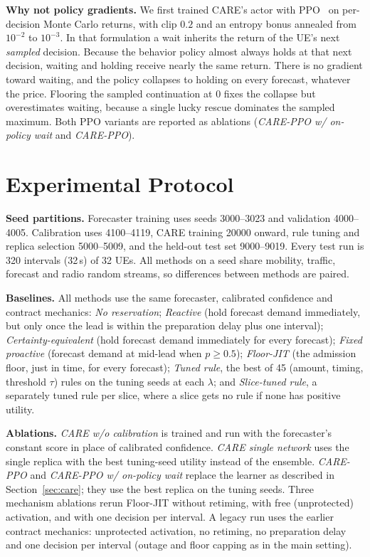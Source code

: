 \documentclass[journal]{IEEEtran}
\begin{document}
\textbf{Why not policy gradients.} We first trained CARE's actor with PPO~\cite{schulman2017ppo} on per-decision Monte Carlo returns, with clip $0.2$ and an entropy bonus annealed from $10^{-2}$ to $10^{-3}$. In that formulation a wait inherits the return of the UE's next \emph{sampled} decision. Because the behavior policy almost always holds at that next decision, waiting and holding receive nearly the same return. There is no gradient toward waiting, and the policy collapses to holding on every forecast, whatever the price. Flooring the sampled continuation at $0$ fixes the collapse but overestimates waiting, because a single lucky rescue dominates the sampled maximum. Both PPO variants are reported as ablations (\emph{CARE-PPO w/ on-policy wait} and \emph{CARE-PPO}).

\section{Experimental Protocol}\label{sec:protocol}
\textbf{Seed partitions.} Forecaster training uses seeds 3000--3023 and validation 4000--4005. Calibration uses 4100--4119, CARE training 20000 onward, rule tuning and replica selection 5000--5009, and the held-out test set 9000--9019. Every test run is 320 intervals (32\,s) of 32 UEs. All methods on a seed share mobility, traffic, forecast and radio random streams, so differences between methods are paired.

\textbf{Baselines.} All methods use the same forecaster, calibrated confidence and contract mechanics:
\emph{No reservation};
\emph{Reactive} (hold forecast demand immediately, but only once the lead is within the preparation delay plus one interval);
\emph{Certainty-equivalent} (hold forecast demand immediately for every forecast);
\emph{Fixed proactive} (forecast demand at mid-lead when $p\ge0.5$);
\emph{Floor-JIT} (the admission floor, just in time, for every forecast);
\emph{Tuned rule}, the best of 45 (amount, timing, threshold $\tau$) rules on the tuning seeds at each $\lambda$; and
\emph{Slice-tuned rule}, a separately tuned rule per slice, where a slice gets no rule if none has positive utility.

\textbf{Ablations.} \emph{CARE w/o calibration} is trained and run with the forecaster's constant score in place of calibrated confidence. \emph{CARE single network} uses the single replica with the best tuning-seed utility instead of the ensemble. \emph{CARE-PPO} and \emph{CARE-PPO w/ on-policy wait} replace the learner as described in Section~\ref{sec:care}; they use the best replica on the tuning seeds. Three mechanism ablations rerun Floor-JIT without retiming, with free (unprotected) activation, and with one decision per interval. A legacy run uses the earlier contract mechanics: unprotected activation, no retiming, no preparation delay and one decision per interval (outage and floor capping as in the main setting).
\end{document}
